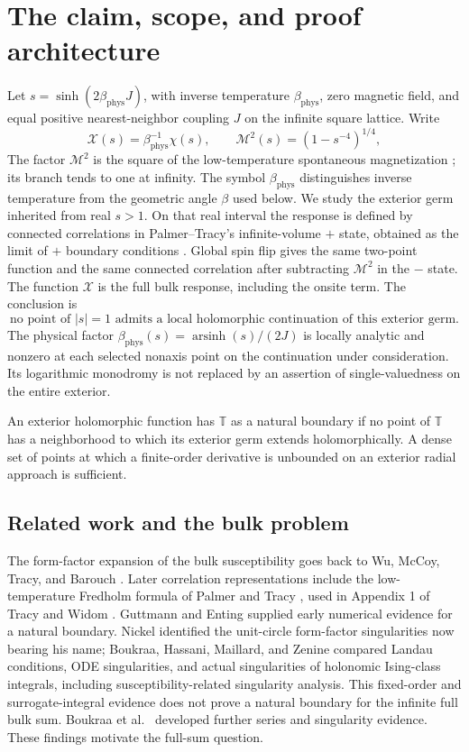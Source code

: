 \documentclass[11pt]{article}
\numberwithin{equation}{section}
\theoremstyle{definition}
\newcommand{\T}{\mathbb T}
\newcommand{\M}{\mathcal M}
\begin{document}
\section{The claim, scope, and proof architecture}\label{sec:scope}
Let \(s=\sinh(2\beta_{\mathrm{phys}} J)\), with inverse temperature
\(\beta_{\mathrm{phys}}\), zero magnetic field, and equal positive
nearest-neighbor coupling \(J\) on the infinite square lattice. Write
\[
 \mathcal X(s)=\beta_{\mathrm{phys}}^{-1}\chi(s),\qquad
 \M^2(s)=(1-s^{-4})^{1/4},
\]
The factor \(\M^2\) is the square of the low-temperature spontaneous
magnetization \cite{Yang1952}; its branch tends to one at infinity.
The symbol \(\beta_{\mathrm{phys}}\) distinguishes inverse temperature
from the geometric angle \(\beta\) used below. We study the exterior
germ inherited from real \(s>1\). On that real interval the response is
defined by connected correlations in Palmer--Tracy's infinite-volume
\(+\) state, obtained as the limit of \(+\) boundary conditions
\cite[pp.~332, 361]{PalmerTracy1981}. Global spin flip gives the same
two-point function and the same connected correlation after subtracting
\(\M^2\) in the \(-\) state. The function \(\mathcal X\) is the full
bulk response, including the onsite term. The conclusion is
\[
 \text{no point of }|s|=1\text{ admits a local holomorphic
 continuation of this exterior germ.}
\]
The physical factor \(\beta_{\mathrm{phys}}(s)=\operatorname{arsinh}(s)/(2J)\) is locally
analytic and nonzero at each selected nonaxis point on the continuation
under consideration. Its logarithmic monodromy is not replaced by an
assertion of single-valuedness on the entire exterior.

An exterior holomorphic function has \(\T\) as a natural boundary if no
point of \(\T\) has a neighborhood to which its exterior germ extends
holomorphically. A dense set of points at which a finite-order derivative
is unbounded on an exterior radial approach is sufficient.

\subsection{Related work and the bulk problem}
The form-factor expansion of the bulk susceptibility goes back to
Wu, McCoy, Tracy, and Barouch \cite{WMTB1976}. Later correlation
representations include the low-temperature Fredholm formula of
Palmer and Tracy \cite{PalmerTracy1981}, used in Appendix 1 of
Tracy and Widom \cite{TW2014}. Guttmann and Enting
\cite{GuttmannEnting1996} supplied early numerical evidence for a
natural boundary. Nickel \cite{Nickel1999,Nickel2000} identified
the unit-circle form-factor singularities now bearing his name;
Boukraa, Hassani, Maillard, and Zenine \cite{Boukraa2007}
compared Landau conditions, ODE singularities, and actual singularities
of holonomic Ising-class integrals, including susceptibility-related
singularity analysis. This fixed-order and surrogate-integral evidence
does not prove a natural boundary for the infinite full bulk sum.
Boukraa et al.\ \cite{Boukraa2008} developed further series and
singularity evidence. These findings motivate the full-sum question.
\end{document}
